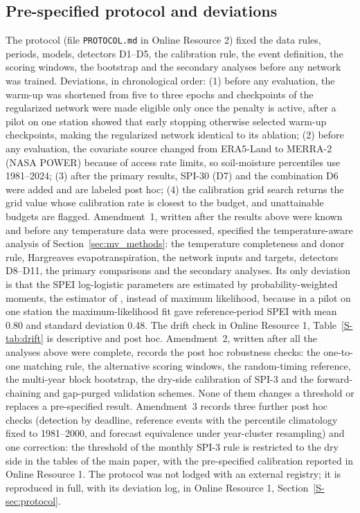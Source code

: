 \documentclass[pdflatex,sn-mathphys-ay]{sn-jnl}
\theoremstyle{thmstyletwo}
\begin{document}
\begin{appendices}
\section{Pre-specified protocol and deviations}\label{app:protocol}
The protocol (file \texttt{PROTOCOL.md} in Online Resource 2) fixed the data rules, periods, models,
detectors D1--D5, the calibration rule, the event definition, the scoring windows, the bootstrap and the
secondary analyses before any network was trained. Deviations, in chronological order: (1) before any
evaluation, the warm-up was shortened from five to three epochs and checkpoints of the regularized network were made eligible
only once the penalty is active, after a pilot on one station showed that early stopping otherwise
selected warm-up checkpoints, making the regularized network identical to its ablation; (2) before any
evaluation, the covariate source changed from ERA5-Land to MERRA-2 (NASA POWER) because of access rate
limits, so soil-moisture percentiles use 1981--2024; (3) after the primary results, SPI-30 (D7) and the
combination D6 were added and are labeled post hoc; (4) the calibration grid search returns the grid
value whose calibration rate is closest to the budget, and unattainable budgets are flagged.
Amendment~1, written after the results above were known and before any temperature data were processed,
specified the temperature-aware analysis of Section~\ref{sec:mv_methods}: the temperature completeness and
donor rule, Hargreaves evapotranspiration, the network inputs and targets, detectors D8--D11, the primary
comparisons and the secondary analyses. Its only deviation is that the SPEI log-logistic parameters are
estimated by probability-weighted moments, the estimator of \citet{vicenteserrano2010}, instead of maximum
likelihood, because in a pilot on one station the maximum-likelihood fit gave reference-period SPEI with
mean 0.80 and standard deviation 0.48. The drift check in Online Resource 1, Table~\ref{S-tab:drift} is
descriptive and post hoc. Amendment~2, written after all the analyses above were complete, records the
post hoc robustness checks: the one-to-one matching rule, the alternative scoring windows, the
random-timing reference, the multi-year block bootstrap, the dry-side calibration of SPI-3 and the
forward-chaining and gap-purged validation schemes. None of them changes a threshold or replaces a
pre-specified result. Amendment~3 records three further post hoc checks (detection by deadline, reference
events with the percentile climatology fixed to 1981--2000, and forecast equivalence under year-cluster
resampling) and one correction: the threshold of the monthly SPI-3 rule is restricted to the dry side in
the tables of the main paper, with the pre-specified calibration reported in Online Resource 1. The
protocol was not lodged with an external registry; it is reproduced in full,
with its deviation log, in Online Resource 1, Section~\ref{S-sec:protocol}.
\end{appendices}
\end{document}
